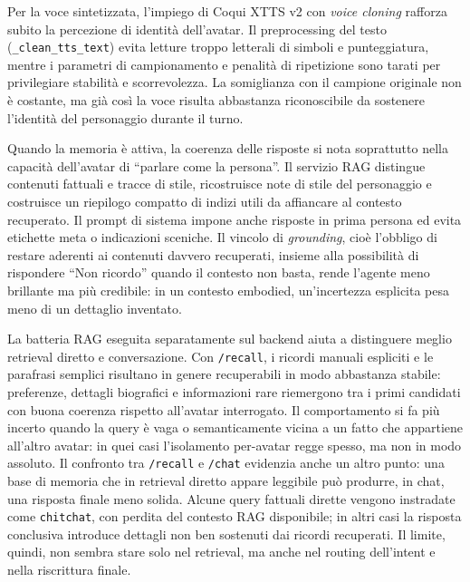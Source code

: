 Per la voce sintetizzata, l'impiego di Coqui XTTS v2 con \emph{voice cloning} rafforza subito la percezione di identità dell'avatar. Il preprocessing del testo (\texttt{\_clean\_tts\_text}) evita letture troppo letterali di simboli e punteggiatura, mentre i parametri di campionamento e penalità di ripetizione sono tarati per privilegiare stabilità e scorrevolezza. La somiglianza con il campione originale non è costante, ma già così la voce risulta abbastanza riconoscibile da sostenere l'identità del personaggio durante il turno.

Quando la memoria è attiva, la coerenza delle risposte si nota soprattutto nella capacità dell'avatar di ``parlare come la persona''. Il servizio RAG distingue contenuti fattuali e tracce di stile, ricostruisce note di stile del personaggio e costruisce un riepilogo compatto di indizi utili da affiancare al contesto recuperato. Il prompt di sistema impone anche risposte in prima persona ed evita etichette meta o indicazioni sceniche. Il vincolo di \emph{grounding}, cioè l'obbligo di restare aderenti ai contenuti davvero recuperati, insieme alla possibilità di rispondere ``Non ricordo'' quando il contesto non basta, rende l'agente meno brillante ma più credibile: in un contesto embodied, un'incertezza esplicita pesa meno di un dettaglio inventato.

La batteria RAG eseguita separatamente sul backend aiuta a distinguere meglio retrieval diretto e conversazione. Con \texttt{/recall}, i ricordi manuali espliciti e le parafrasi semplici risultano in genere recuperabili in modo abbastanza stabile: preferenze, dettagli biografici e informazioni rare riemergono tra i primi candidati con buona coerenza rispetto all'avatar interrogato. Il comportamento si fa più incerto quando la query è vaga o semanticamente vicina a un fatto che appartiene all'altro avatar: in quei casi l'isolamento per-avatar regge spesso, ma non in modo assoluto. Il confronto tra \texttt{/recall} e \texttt{/chat} evidenzia anche un altro punto: una base di memoria che in retrieval diretto appare leggibile può produrre, in chat, una risposta finale meno solida. Alcune query fattuali dirette vengono instradate come \texttt{chitchat}, con perdita del contesto RAG disponibile; in altri casi la risposta conclusiva introduce dettagli non ben sostenuti dai ricordi recuperati. Il limite, quindi, non sembra stare solo nel retrieval, ma anche nel routing dell'intent e nella riscrittura finale.

